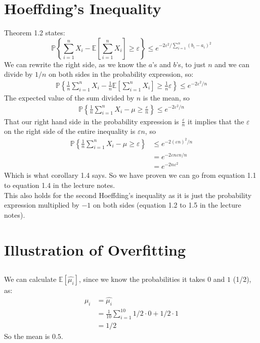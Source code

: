 \documentclass[a4paper]{article}
\begin{document}
\section{Hoeffding's Inequality}
Theorem 1.2 states:
\begin{equation}
\mathbb{P}\left\{\sum_{i=1}^n X_i-\mathbb{E}\left[\sum_{i=1}^n X_i\right]\geq \varepsilon\right\}\leq e^{-2\varepsilon^2/\sum_{i=1}^n (b_i-a_i)^2}
\end{equation}
We can rewrite the right side, as we know the $a$'s and $b$'s, to just $n$ and we can divide by $1/n$ on both sides in the probability expression, so:
\begin{align*}
\mathbb{P}\left\{\frac{1}{n}\sum_{i=1}^n X_i-\frac{1}{n}\mathbb{E}\left[\sum_{i=1}^n X_i\right]\geq \frac{1}{n}\varepsilon\right\}\leq e^{-2\varepsilon^2/n}
\end{align*}
The expected value of the sum divided by $n$ is the mean, so
\begin{align*}
\mathbb{P}\left\{\frac{1}{n}\sum_{i=1}^n X_i-\mu\geq \frac{\varepsilon}{n}\right\}\leq e^{-2\varepsilon^2/n}
\end{align*}
That our right hand side in the probability expression is $\frac{\varepsilon}{n}$ it implies that the $\varepsilon$ on the right side of the entire inequality is $\varepsilon n$, so
\begin{align*}
\mathbb{P}\left\{\frac{1}{n}\sum_{i=1}^n X_i-\mu\geq \varepsilon\right\}&\leq e^{-2(\varepsilon n)^2/n} \\
&= e^{-2\varepsilon n\varepsilon n/n} \\
&= e^{-2n\varepsilon^2}
\end{align*}
Which is what corollary 1.4 says. So we have proven we can go from equation 1.1 to equation 1.4 in the lecture notes. \\
This also holds for the second Hoeffding's inequality as it is just the probability expression multiplied by $-1$ on both sides (equation 1.2 to 1.5 in the lecture notes).

\section{Illustration of Overfitting}
\subsection{}
We can calculate $\mathbb{E}[\hat{\mu_i}]$, since we know the probabilities it takes $0$ and $1$ (1/2), as:
\begin{align*}
\mu_i&=\hat{\mu_i} \\
&= \frac{1}{10}\sum_{i=1}^{10} 1/2\cdot 0 + 1/2\cdot 1 \\
&= 1/2
\end{align*}
So the mean is $0.5$.
\end{document}
